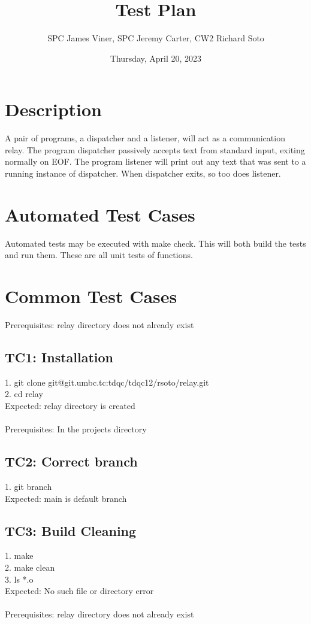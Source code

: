 \documentclass{article}
\title{Test Plan}
\author{SPC James Viner, SPC Jeremy Carter, CW2 Richard Soto}
\date{Thursday, April 20, 2023}
\begin{document}
  \maketitle

  \section*{Description}
A pair of programs, a dispatcher and a listener, will act as a communication relay.
  The program dispatcher passively accepts text from standard input, exiting normally on EOF.
  The program listener will print out any text that was sent to a running instance of dispatcher. When
  dispatcher exits, so too does listener.

  \section*{Automated Test Cases}
  Automated  tests  may  be  executed  with  make check.  This  will  both  build  the  tests  and  run  them.  These
are all unit tests of functions.

  \section*{Common Test Cases}
  Prerequisites: relay directory does not already exist
  \subsection*{TC1: Installation}
  1. git clone git@git.umbc.tc:tdqc/tdqc12/rsoto/relay.git\\
  2. cd relay\\
	Expected: relay directory is created\\
  \\Prerequisites: In the projects directory
  \subsection*{TC2: Correct branch}
  1. git branch\\
Expected: main is default branch\\
  \subsection*{TC3: Build Cleaning}
  1. make\\
2. make clean\\
3. ls *.o\\
Expected: No such file or directory error\\
  \\Prerequisites: relay directory does not already exist
\end{document}
